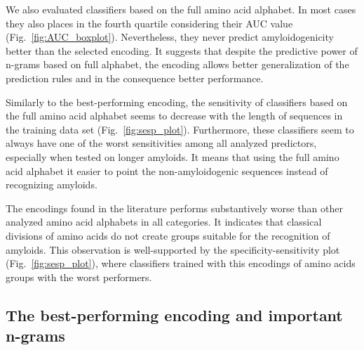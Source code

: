 \documentclass{bioinfo}
\begin{document}
  We also evaluated classifiers based on the full amino acid alphabet. In most 
cases they also places in the fourth quartile considering their AUC value 
(Fig.~\ref{fig:AUC_boxplot}). Nevertheless, they never predict amyloidogenicity 
better than the selected encoding. It suggests that despite the predictive power 
of n-grams based on full alphabet, the encoding allows better generalization of 
the prediction rules and in the consequence better performance.

  Similarly to the best-performing encoding, the sensitivity of classifiers 
based on the full amino acid alphabet seems to decrease with the length of 
sequences in the training data set (Fig.~\ref{fig:sesp_plot}). Furthermore, 
these classifiers seem to always have one of the worst sensitivities among all 
analyzed predictors, especially when tested on longer amyloids. It means that 
using the full amino acid alphabet it easier to point the non-amyloidogenic 
sequences instead of recognizing amyloids.

  The encodings found in the literature performs substantively worse than other 
analyzed amino acid alphabets in all categories. It indicates that classical 
divisions of amino acids do not create groups suitable for the recognition of 
amyloids. This observation is well-supported by the specificity-sensitivity 
plot (Fig.~\ref{fig:sesp_plot}), where classifiers trained with this encodings 
of amino acids groups with the worst performers.

\subsection{The best-performing encoding and important n-grams}
\end{document}
